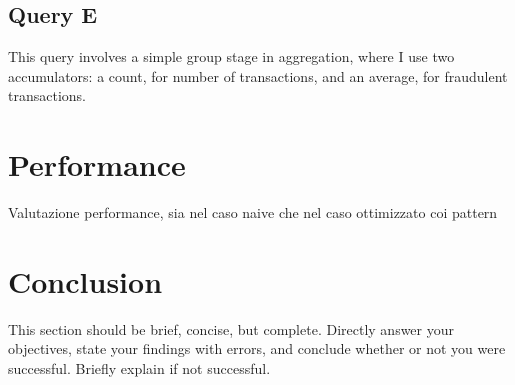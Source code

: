 \documentclass[runningheads]{llncs}
\begin{document}
\subsection{Query E}
This query involves a simple group stage in aggregation, where I use two accumulators: a count, for number of transactions, and an average, for fraudulent transactions.
\section{Performance}
Valutazione performance, sia nel caso naive che nel caso ottimizzato coi pattern

\section{Conclusion}
This section should be brief, concise, but complete. Directly answer your objectives, state your findings with errors, and conclude whether or not you were successful. Briefly explain if not successful.
\end{document}
